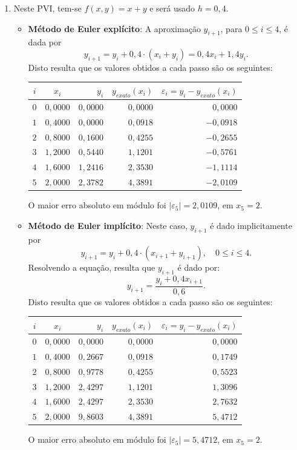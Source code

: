 \documentclass[12pt,a4paper]{article}
\begin{document}
\begin{enumerate}
\begin{enumerate}
\begin{itemize}
\end{itemize}
\item Neste PVI, tem-se $f(x, y) = x + y$ e será usado $h = 0,4$.
\begin{itemize}
\item \textbf{Método de Euler explícito}: A aproximação $y_{i + 1}$, para $0 \leq i \leq 4$, é dada por
\[
y_{i + 1}
= y_{i} + 0,4 \cdot \left( x_i + y_i \right)
= 0,4 x_i + 1,4 y_{i}.
\]
Disto resulta que os valores obtidos a cada passo são os seguintes:

\medskip
\begin{center}
\begin{tabular}{ccrrr}
\hline
$i$ & $x_i$ & $y_i$ & $y_{exato}(x_i)$ & $\varepsilon_i = y_i-y_{exato}(x_i)$ \\ \hline
$0$ & $0,0000$ & $0,0000$ & $0,0000$ & $ 0,0000$ \\
$1$ & $0,4000$ & $0,0000$ & $0,0918$ & $-0,0918$ \\
$2$ & $0,8000$ & $0,1600$ & $0,4255$ & $-0,2655$ \\
$3$ & $1,2000$ & $0,5440$ & $1,1201$ & $-0,5761$ \\
$4$ & $1,6000$ & $1,2416$ & $2,3530$ & $-1,1114$ \\
$5$ & $2,0000$ & $2,3782$ & $4,3891$ & $-2,0109$ \\
\hline
\end{tabular}
\end{center}
\medskip
O maior erro absoluto em módulo foi $|\varepsilon_5| = 2,0109$, em $x_5 = 2$.

\item \textbf{Método de Euler implícito}: Neste caso, $y_{i + 1}$ é dado implicitamente por
\[
y_{i + 1}
= y_{i} + 0,4 \cdot \left( x_{i + 1} + y_{i + 1} \right),
\quad 0 \leq i \leq 4.
\]
Resolvendo a equação, resulta que $y_{i + 1}$ é dado por:
\[
y_{i + 1}
= \frac{y_{i} + 0,4 x_{i + 1}}{0,6}.
\]
Disto resulta que os valores obtidos a cada passo são os seguintes:

\medskip
\begin{center}
\begin{tabular}{ccrrr}
\hline
$i$ & $x_i$ & $y_i$ & $y_{exato}(x_i)$ & $\varepsilon_i = y_i-y_{exato}(x_i)$ \\ \hline
$0$ & $0,0000$ & $0,0000$ & $0,0000$ & $0,0000$ \\
$1$ & $0,4000$ & $0,2667$ & $0,0918$ & $0,1749$ \\
$2$ & $0,8000$ & $0,9778$ & $0,4255$ & $0,5523$ \\
$3$ & $1,2000$ & $2,4297$ & $1,1201$ & $1,3096$ \\
$4$ & $1,6000$ & $2,4297$ & $2,3530$ & $2,7632$ \\
$5$ & $2,0000$ & $9,8603$ & $4,3891$ & $5,4712$ \\
\hline
\end{tabular}
\end{center}
\medskip
O maior erro absoluto em módulo foi $|\varepsilon_5| = 5,4712$, em $x_5 = 2$.


\end{itemize}
\end{enumerate}
\end{enumerate}
\end{document}
